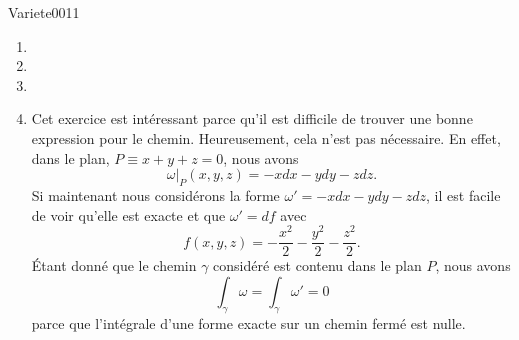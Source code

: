 
\begin{corrige}{Variete0011}

	\begin{enumerate}

		\item
		\item
		\item
		\item
			Cet exercice est intéressant parce qu'il est difficile de trouver une bonne expression pour le chemin. Heureusement, cela n'est pas nécessaire. En effet, dans le plan, $P\equiv x+y+z=0$, nous avons
			\begin{equation}
				\omega|_{P}(x,y,z)=-xdx-ydy-zdz.
			\end{equation}
			Si maintenant nous considérons la forme $\omega'=-xdx-ydy-zdz$, il est facile de voir qu'elle est exacte et que $\omega'=df$ avec
			\begin{equation}
				f(x,y,z)=-\frac{ x^2 }{2}-\frac{ y^2 }{2}-\frac{ z^2 }{2}.
			\end{equation}
			Étant donné que le chemin $\gamma$ considéré est contenu dans le plan $P$, nous avons
			\begin{equation}
				\int_{\gamma}\omega=\int_{\gamma}\omega'=0
			\end{equation}
			parce que l'intégrale d'une forme exacte sur un chemin fermé est nulle.
	\end{enumerate}
\end{corrige}

